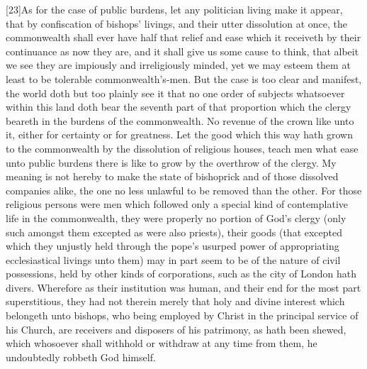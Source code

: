 [23]As for the case of public burdens, let any politician living make it appear, that by confiscation of bishops’ livings, and their utter dissolution at once, the commonwealth shall ever have half that relief and ease which it receiveth by their continuance as now they are, and it shall give us some cause to think, that albeit we see they are impiously and irreligiously minded, yet we may esteem them at least to be tolerable commonwealth’s-men. But the case is too clear and manifest, the world doth but too plainly see it that no one order of subjects whatsoever within this land doth bear the seventh part of that proportion which the clergy beareth in the burdens of the commonwealth. No revenue of the crown like unto it, either for certainty or for greatness. Let the good which this way hath grown to the commonwealth by the dissolution of religious houses, teach men what ease unto public burdens there is like to grow by the overthrow of the clergy. My meaning is not hereby to make the state of bishoprick and of those dissolved companies alike, the one no less unlawful to be removed than the other. For those religious persons were men which followed only a special kind of contemplative life in the commonwealth, they were properly no portion of God’s clergy (only such amongst them excepted as were also priests), their goods (that excepted which they unjustly held through the pope’s usurped power of appropriating ecclesiastical livings unto them) may in part seem to be of the nature of civil possessions, held by other kinds of corporations, such as the city of London hath divers. Wherefore as their institution was human, and their end for the most part superstitious, they had not therein merely that holy and divine interest which belongeth unto bishops, who being employed by Christ in the principal service of his Church, are receivers and disposers of his patrimony, as hath been shewed, which whosoever shall withhold or withdraw at any time from them, he undoubtedly robbeth God himself.

